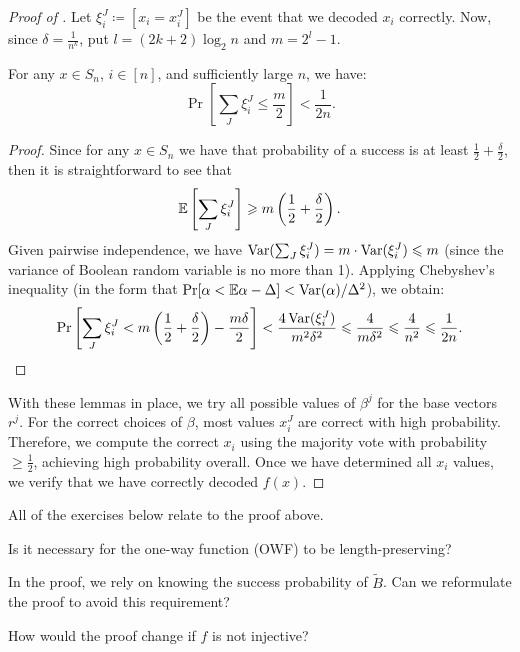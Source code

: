 \begin{proof}[Proof of ]
	Let $\xi_i^J \coloneqq [x_i = x_i^J]$ be the event that we decoded $x_i$ correctly.
	Now, since $\delta = \frac{1}{n^{k}}$, put $l = (2k + 2) \log_2 n$ and $m = 2^{l} - 1$.

	\begin{lemma}
	   For any $x \in S_n$, $i \in [n]$, and sufficiently large $n$, we have:
		\[
			\Pr\left[\sum_J \xi_i^J \leq \frac{m}{2}\right] < \frac{1}{2n}.
		\] 
	\end{lemma}

	\begin{proof}
		Since for any $x \in  S_n$ we have that probability of a success is at least $\frac{1}{2} + \frac{\delta}{2}$, then it is straightforward to see that
		\[
			\mathbb{E}\left[\sum_J \xi_i^J\right] \geqslant m\left(\frac{1}{2} + \frac{\delta}{2}\right).
		\]
		Given pairwise independence, we have $\operatorname{Var}(\sum_J \xi_i^J) = m \cdot \operatorname{Var}(\xi_i^J) \leqslant m$ (since the variance of Boolean random variable is no more than 1).
		Applying Chebyshev's inequality (in the form that $\Pr[\alpha < \mathbb{E} \alpha - \Delta] < \operatorname{Var}(\alpha) / \Delta^2$), we obtain:
		\[
			\Pr\left[\sum_J \xi_i^J < m\left(\frac{1}{2} + \frac{\delta}{2}\right) - \frac{m\delta}{2}\right] < \frac{4 \operatorname{Var}(\xi_i^J)}{m^2 \delta^2} \leqslant \frac{4}{m \delta^2} \leqslant \frac{4}{n^2} \leqslant \frac{1}{2n}.
		\] 
	\end{proof}

	With these lemmas in place, we try all possible values of $\beta^j$ for the base vectors $r^j$.
	For the correct choices of $\beta$, most values $x_i^J$ are correct with high probability.
	Therefore, we compute the correct $x_i$ using the majority vote with probability $\geq \frac{1}{2}$, achieving high probability overall.
	Once we have determined all $x_i$ values, we verify that we have correctly decoded $f(x)$.
\end{proof}

All of the exercises below relate to the proof above.

\begin{exercise}
    Is it necessary for the one-way function (OWF) to be length-preserving?
\end{exercise}

\begin{exercise}
    In the proof, we rely on knowing the success probability of $\tilde{B}$.
    Can we reformulate the proof to avoid this requirement?
\end{exercise}

\begin{exercise}
    How would the proof change if $f$ is not injective?
\end{exercise}

